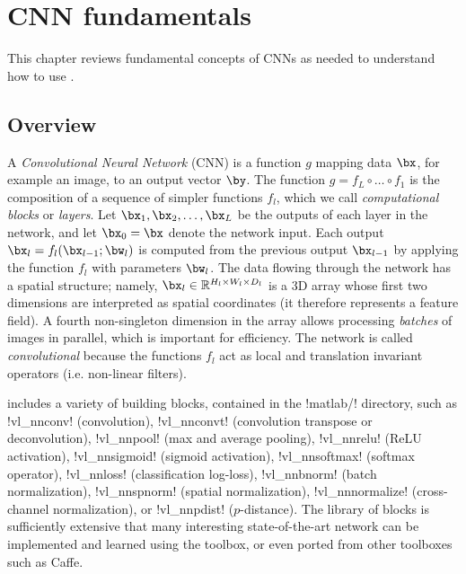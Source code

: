 \chapter{CNN fundamentals}\label{s:fundamentals}

This chapter reviews fundamental concepts of CNNs as needed to understand how to use \matconvnet.

\section{Overview}\label{s:cnn-structure}

A \emph{Convolutional Neural Network} (CNN) is a function $g$ mapping data $\bx$, for example an image, to an output vector $\by$. The function $g=f_L \circ \dots \circ f_1$ is the composition of a sequence of simpler functions $f_l$, which we  call \emph{computational blocks} or \emph{layers}.  Let $\bx_1,\bx_2,\dots,\bx_L$ be the outputs of each layer in the network, and let $\bx_0=\bx$ denote the network input. Each output $\bx_l = f_l(\bx_{l-1};\bw_l)$ is computed from the previous output $\bx_{l-1}$  by applying the function $f_l$ with parameters $\bw_l$. The data flowing through the network has a spatial structure; namely,  $\bx_l\in\mathbb{R}^{H_l \times W_l \times D_l}$ is a 3D array whose first two dimensions are interpreted as spatial coordinates (it therefore represents a feature field).  A fourth non-singleton dimension in the array allows processing \emph{batches} of images in parallel, which is important for efficiency. The network is called \emph{convolutional} because the functions $f_l$ act as local and translation invariant operators (i.e. non-linear filters). 

\matlab includes a variety of  building blocks, contained in the !matlab/! directory, such as !vl_nnconv! (convolution), !vl_nnconvt! (convolution transpose or deconvolution), !vl_nnpool! (max and average pooling), !vl_nnrelu! (ReLU activation), !vl_nnsigmoid! (sigmoid activation), !vl_nnsoftmax! (softmax operator), !vl_nnloss! (classification log-loss), !vl_nnbnorm! (batch normalization), !vl_nnspnorm! (spatial normalization), !vl_nnnormalize! (cross-channel normalization), or !vl_nnpdist! ($p$-distance).  The library of blocks is sufficiently extensive that many interesting state-of-the-art network can be implemented and learned using the toolbox, or even ported from other toolboxes such as Caffe.

